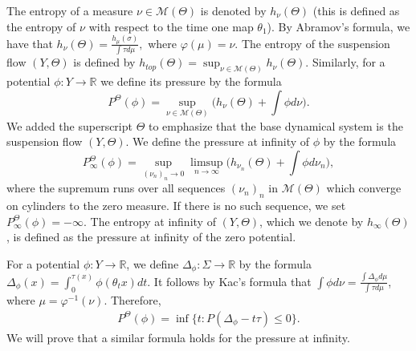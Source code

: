 \documentclass[letterpaper,11pt]{amsart}
\theoremstyle{plain}
\theoremstyle{plain}
\theoremstyle{definition}
\theoremstyle{remark}
\def\R{{\mathbb R}}
\def\M{{\mathcal M}}
\begin{document}
The entropy of a measure $\nu\in \M(\Theta)$ is denoted  by $h_\nu(\Theta)$ (this is defined as the entropy of $\nu$ with respect to the time one map $\theta_1$).  By Abramov's formula, we have that $h_\nu(\Theta)=\frac{h_\mu(\sigma)}{\int \tau d\mu},$ where $\varphi(\mu)=\nu$.  The entropy of  the suspension flow $(Y,\Theta)$ is defined by $h_{top}(\Theta)=\sup_{\nu\in\M(\Theta)} h_\nu(\Theta).$
Similarly, for a potential $\phi:Y\to\R$ we define its pressure by the formula 
$$P^\Theta(\phi)=\sup_{\nu\in\M(\Theta)} \bigg(h_\nu(\Theta)+\int \phi d\nu\bigg).$$
We added the superscript $\Theta$ to emphasize that the base dynamical system is the suspension flow $(Y,\Theta)$. We define the pressure at infinity of $\phi$ by the formula
$$P^\Theta_\infty(\phi)=\sup_{(\nu_n)_n\to 0} \limsup_{n\to\infty}\bigg( h_{\nu_n}(\Theta)+\int \phi d\nu_n\bigg),$$
where the supremum runs over all sequences $(\nu_n)_n$ in $\M(\Theta)$ which converge on cylinders to the zero measure. If  there is no such sequence, we set $P^\Theta_\infty(\phi)=-\infty$.  The entropy at infinity of $(Y,\Theta)$, which we denote by $h_{\infty}(\Theta)$, is defined as the pressure at infinity of the zero potential. 

For a potential $\phi:Y\to\R$, we define $\Delta_\phi:\Sigma\to\R$ by the formula $\Delta_\phi(x)=\int_0^{\tau(x)}\phi(\theta_t x)dt$. It follows by Kac's formula that  $\int \phi d\nu=\frac{\int \Delta_\phi d\mu}{\int \tau d\mu}$, where $\mu=\varphi^{-1}(\nu)$. Therefore, \begin{align}\label{presusp} P^\Theta(\phi)=\inf\{t: P(\Delta_\phi- t\tau)\le 0\}.\end{align}
We will prove that a similar formula holds for the pressure at infinity.
\end{document}
